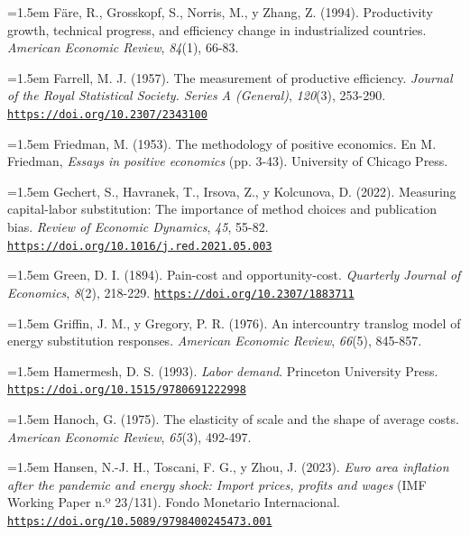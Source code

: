 \documentclass[10pt,a4paper]{article}
\begin{document}
\noindent\hangindent=1.5em Färe, R., Grosskopf, S., Norris, M., y Zhang, Z. (1994). Productivity growth, technical progress, and efficiency change in industrialized countries. \textit{American Economic Review}, \textit{84}(1), 66-83.

\noindent\hangindent=1.5em Farrell, M. J. (1957). The measurement of productive efficiency. \textit{Journal of the Royal Statistical Society. Series A (General)}, \textit{120}(3), 253-290. \href{https://doi.org/10.2307/2343100}{\nolinkurl{https://doi.org/10.2307/2343100}}

\noindent\hangindent=1.5em Friedman, M. (1953). The methodology of positive economics. En M. Friedman, \textit{Essays in positive economics} (pp. 3-43). University of Chicago Press.

\noindent\hangindent=1.5em Gechert, S., Havranek, T., Irsova, Z., y Kolcunova, D. (2022). Measuring capital-labor substitution: The importance of method choices and publication bias. \textit{Review of Economic Dynamics}, \textit{45}, 55-82. \href{https://doi.org/10.1016/j.red.2021.05.003}{\nolinkurl{https://doi.org/10.1016/j.red.2021.05.003}}

\noindent\hangindent=1.5em Green, D. I. (1894). Pain-cost and opportunity-cost. \textit{Quarterly Journal of Economics}, \textit{8}(2), 218-229. \href{https://doi.org/10.2307/1883711}{\nolinkurl{https://doi.org/10.2307/1883711}}

\noindent\hangindent=1.5em Griffin, J. M., y Gregory, P. R. (1976). An intercountry translog model of energy substitution responses. \textit{American Economic Review}, \textit{66}(5), 845-857.

\noindent\hangindent=1.5em Hamermesh, D. S. (1993). \textit{Labor demand}. Princeton University Press. \href{https://doi.org/10.1515/9780691222998}{\nolinkurl{https://doi.org/10.1515/9780691222998}}

\noindent\hangindent=1.5em Hanoch, G. (1975). The elasticity of scale and the shape of average costs. \textit{American Economic Review}, \textit{65}(3), 492-497.

\noindent\hangindent=1.5em Hansen, N.-J. H., Toscani, F. G., y Zhou, J. (2023). \textit{Euro area inflation after the pandemic and energy shock: Import prices, profits and wages} (IMF Working Paper n.º 23/131). Fondo Monetario Internacional. \href{https://doi.org/10.5089/9798400245473.001}{\nolinkurl{https://doi.org/10.5089/9798400245473.001}}
\end{document}
